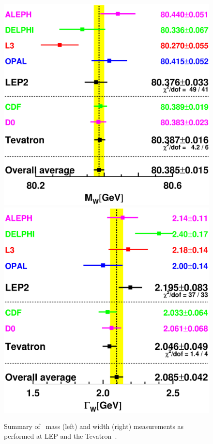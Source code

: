 
\begin{figure}[ht]
\centering
\includegraphics[width=.45\textwidth]{figures/theory/wmass_pdg.eps}
\includegraphics[width=.45\textwidth]{figures/theory/wwidth_pdg.eps}
\caption{Summary of \dubya~mass (left) and width (right) measurements
as performed at LEP and the Tevatron~\cite{PDG:2014}.}
\label{fig:theory_w_pdg}
\end{figure}


